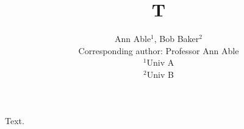 \documentclass{article}
\begin{document}
\title{T}\author{Ann Able$^{1}$, Bob Baker$^{2}$\\ Corresponding author: Professor Ann Able\\ $^{1}$Univ A\\ $^{2}$Univ B}
\maketitle
Text.
\end{document}
